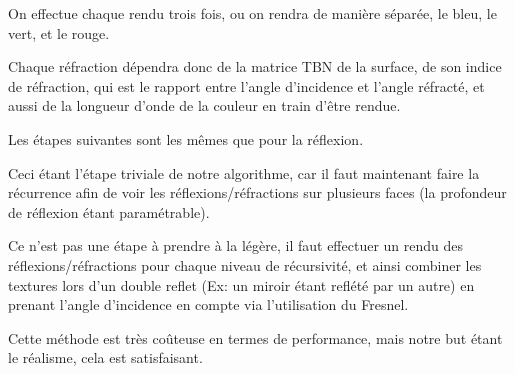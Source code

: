On effectue chaque rendu trois fois, ou on rendra de manière séparée, le bleu, le vert, et le rouge.

Chaque réfraction dépendra donc de la matrice TBN de la surface, de son indice de réfraction, qui est
le rapport entre l'angle d'incidence et l'angle réfracté, et aussi de la longueur d'onde de la couleur
en train d'être rendue.

Les étapes suivantes sont les mêmes que pour la réflexion.

Ceci étant l'étape triviale de notre algorithme, car il faut maintenant faire la récurrence afin de voir
les réflexions/réfractions sur plusieurs faces (la profondeur de réflexion étant paramétrable).

Ce n'est pas une étape à prendre à la légère, il faut effectuer un rendu des réflexions/réfractions pour
chaque niveau de récursivité, et ainsi combiner les textures lors d'un double reflet (Ex: un miroir étant
reflété par un autre) en prenant l'angle d'incidence en compte via l'utilisation du Fresnel.

Cette méthode est très coûteuse en termes de performance, mais notre but étant le réalisme, cela est satisfaisant.

